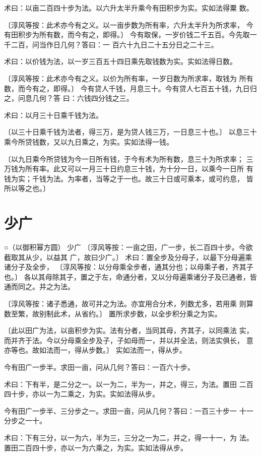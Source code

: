 \documentclass[a4paper,12pt,UTF8,twoside]{ctexbook}
\begin{document}
术曰：以亩二百四十步为法。以六升太半升乘今有田积步为实。实如法得粟 数。

〔淳风等按：此术亦今有之义。以一亩步数为所有率，六升太半升为所求率， 今有田积步为所有数，而今有之，即得。〕 今有取保，一岁价钱二千五百。今先取一千二百，问当作日几何？答曰：一 百六十九日二十五分日之二十三。

术曰：以价钱为法，以一岁三百五十四日乘先取钱数为实。实如法得日数。

〔淳风等按：此术亦今有之义。以价为所有率，一岁日数为所求率，取钱为 所有数，而今有之，即得。〕 今有贷人千钱，月息三十。今有贷人七百五十钱，九日归之，问息几何？答 曰：六钱四分钱之三。

术曰：以月三十日乘千钱为法。

〔以三十日乘千钱为法者，得三万，是为贷人钱三万，一日息三十也。〕 以息三十乘今所贷钱数，又以九日乘之，为实。实如法得一钱。

〔以九日乘今所贷钱为今一日所有钱，于今有术为所有数，息三十为所求率； 三万钱为所有率。此又可以一月三十日约息三十钱，为十分一日，以乘今一日所 有钱为实；千钱为法。为率者，当等之于一也。故三十日或可乘本，或可约息， 皆所以等之也。〕 

\chapter{少广}

○（以御积幂方圆） 少广 〔淳风等按：一亩之田，广一步，长二百四十步。今欲截取其从少，以益其 广，故曰少广。〕 术曰：置全步及分母子，以最下分母遍乘诸分子及全步， 〔淳风等按：以分母乘全步者，通其分也；以母乘子者，齐其子也。〕 各以其母除其子，置之于左，命通分者，又以分母遍乘诸分子及已通者，皆 通而同之。并之为法。

〔淳风等按：诸子悉通，故可并之为法。亦宜用合分术，列数尤多，若用乘 则算数至繁，故别制此术，从省约。〕 置所求步数，以全步积分乘之为实。

〔此以田广为法，以亩积步为实。法有分者，当同其母，齐其子，以同乘法 实，而并齐于法。今以分母乘全步及子，子如母而一，并以并全法，则法实俱长， 意亦等也。故如法而一，得从步数。〕 实如法而一，得从步。

今有田广一步半。求田一亩，问从几何？答曰：一百六十步。

术曰：下有半，是二分之一。以一为二，半为一，并之，得三，为法。置田 二百四十步，亦以一为二乘之，为实。实如法得从步。

今有田广一步半、三分步之一。求田一亩，问从几何？答曰：一百三十步一 十一分步之一十。

术曰：下有三分，以一为六，半为三，三分之一为二，并之，得一十一，为 法。置田二百四十步，亦以一为六乘之，为实。实如法得从步。
\end{document}
